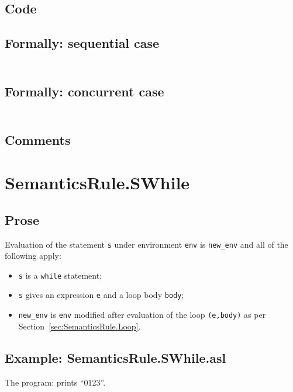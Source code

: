 \documentclass{book}
\begin{document}
  \subsection{Code}

  \subsection{Formally: sequential case}
  \begin{align}
  \end{align} 

  \subsection{Formally: concurrent case}
  \begin{align}
  \end{align} 

    \subsection{Comments}

\section{SemanticsRule.SWhile \label{sec:SemanticsRule.SWhile}}

    \subsection{Prose}
  Evaluation of the statement \texttt{s} under environment \texttt{env} is
\texttt{new\_env} and all of the following apply:
    \begin{itemize}
    \item \texttt{s} is a \texttt{while} statement;
    \item \texttt{s} gives an expression \texttt{e} and a loop body \texttt{body};
    \item \texttt{new\_env} is \texttt{env} modified after evaluation of the loop \texttt{(e,body)} as per Section~\ref{sec:SemanticsRule.Loop}.
    \end{itemize}

    \subsection{Example: SemanticsRule.SWhile.asl}
    The program:
    prints ``0123''.
\end{document}
